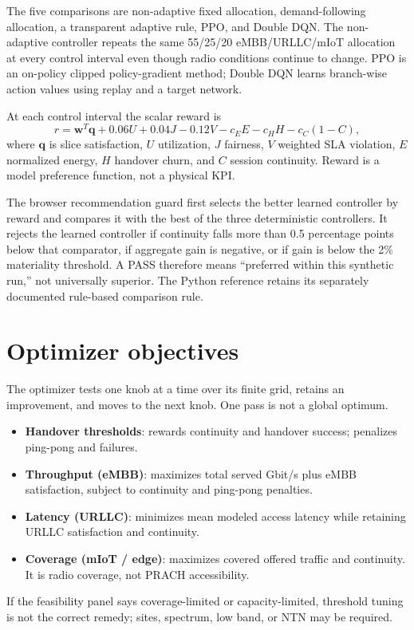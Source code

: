 \documentclass[10pt]{article}
\newcommand{\ui}[1]{\textsf{\textbf{#1}}}
\begin{document}
The five comparisons are non-adaptive fixed allocation, demand-following allocation, a transparent adaptive rule, PPO, and Double DQN. The non-adaptive controller repeats the same 55/25/20 eMBB/URLLC/mIoT allocation at every control interval even though radio conditions continue to change. PPO is an on-policy clipped policy-gradient method; Double DQN learns branch-wise action values using replay and a target network.

At each control interval the scalar reward is
\[
r=\mathbf{w}^{T}\mathbf{q}+0.06U+0.04J-0.12V
-c_EE-c_HH-c_C(1-C),
\]
where $\mathbf q$ is slice satisfaction, $U$ utilization, $J$ fairness, $V$ weighted SLA violation, $E$ normalized energy, $H$ handover churn, and $C$ session continuity. Reward is a model preference function, not a physical KPI.

The browser recommendation guard first selects the better learned controller by reward and compares it with the best of the three deterministic controllers. It rejects the learned controller if continuity falls more than 0.5 percentage points below that comparator, if aggregate gain is negative, or if gain is below the 2\% materiality threshold. A PASS therefore means ``preferred within this synthetic run,'' not universally superior. The Python reference retains its separately documented rule-based comparison rule.

\section{Optimizer objectives}
The optimizer tests one knob at a time over its finite grid, retains an improvement, and moves to the next knob. One pass is not a global optimum.
\begin{itemize}
  \item \ui{Handover thresholds}: rewards continuity and handover success; penalizes ping-pong and failures.
  \item \ui{Throughput (eMBB)}: maximizes total served Gbit/s plus eMBB satisfaction, subject to continuity and ping-pong penalties.
  \item \ui{Latency (URLLC)}: minimizes mean modeled access latency while retaining URLLC satisfaction and continuity.
  \item \ui{Coverage (mIoT / edge)}: maximizes covered offered traffic and continuity. It is radio coverage, not PRACH accessibility.
\end{itemize}
If the feasibility panel says coverage-limited or capacity-limited, threshold tuning is not the correct remedy; sites, spectrum, low band, or NTN may be required.
\end{document}
